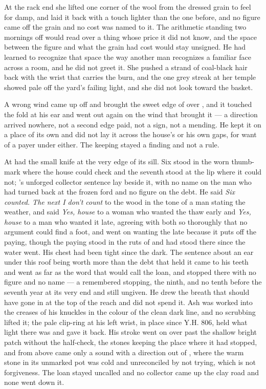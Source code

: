 At the rack end she lifted one corner of the wool from the dressed grain to feel for damp, and laid it back with a touch lighter than the one before, and no figure came off the grain and no cost was named to it. The arithmetic standing two mornings off would read over a thing whose price it did not know, and the space between the figure and what the grain had cost would stay unsigned. He had learned to recognize that space the way another man recognizes a familiar face across a room, and he did not greet it. She pushed a strand of coal-black hair back with the wrist that carries the burn, and the one grey streak at her temple showed pale off the yard's failing light, and she did not look toward the basket.

A wrong wind came up off  and brought the sweet edge of  over , and it touched the fold at his ear and went out again on the wind that brought it --- a direction arrived nowhere, not a second edge paid, not a sign, not a mending. He kept it on a place of its own and did not lay it across the house's  or his own gaps, for want of a payer under either. The keeping stayed a finding and not a rule.

\scenebreak

At   had the small knife at the very edge of its sill. Six stood in the worn thumb-mark where the house could check and the seventh stood at the lip where it could not; 's unforged collector sentence lay beside it, with no name on the man who had turned back at the frozen ford and no figure on the debt. He said \emph{Six counted. The next I don't count} to the wood in the tone of a man stating the weather, and said \emph{Yes, house} to a woman who wanted the thaw early and \emph{Yes, house} to a man who wanted it late, agreeing with both so thoroughly that no argument could find a foot, and went on wanting the late because it puts off the paying, though the paying stood in the ruts of  and had stood there since the water went. His chest had been tight since the dark. The sentence about an ear under this roof being worth more than the debt that held it came to his teeth and went as far as the word that would call the loan, and stopped there with no figure and no name --- a remembered stopping, the ninth, and no tenth before the seventh year at its very end and still ungiven. He drew the breath that should have gone in at the top of the reach and did not spend it. Ash was worked into the creases of his knuckles in the colour of the clean dark line, and no scrubbing lifted it; the pale clip-ring at his left wrist, in place since Y.H. 806, held what light there was and gave it back. His stroke went on over  past the shallow bright patch without the half-check, the stones keeping the place where it had stopped, and from above came only a sound with a direction out of , where the warm stone in its unmarked pot was cold and unreconciled by not trying, which is not forgiveness. The loan stayed uncalled and no collector came up the clay road and none went down it.

